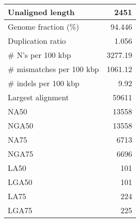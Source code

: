 \documentclass[12pt,a4paper]{article}
\begin{document}
\begin{table}[ht]
\begin{center}
\begin{tabular}{|l*{1}{|r}|}
Unaligned length & 2451 \\ \hline
Genome fraction (\%) & 94.446 \\ \hline
Duplication ratio & 1.056 \\ \hline
\# N's per 100 kbp & 3277.19 \\ \hline
\# mismatches per 100 kbp & 1061.12 \\ \hline
\# indels per 100 kbp & 9.92 \\ \hline
Largest alignment & 59611 \\ \hline
NA50 & 13558 \\ \hline
NGA50 & 13558 \\ \hline
NA75 & 6713 \\ \hline
NGA75 & 6696 \\ \hline
LA50 & 101 \\ \hline
LGA50 & 101 \\ \hline
LA75 & 224 \\ \hline
LGA75 & 225 \\ \hline
\end{tabular}
\end{center}
\end{table}
\end{document}
